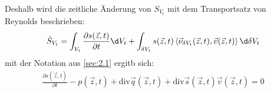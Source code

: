 Deshalb wird die zeitliche Änderung von $S_{V_t}$ mit dem Transportsatz von Reynolds beschrieben:
\begin{align*}
\dot{S}_{V_t} = \int_{V_t} \frac{\partial s(\vec{z},t)}{\partial t}\d V_t + \int_{\delta V_t}s(\vec{z},t) \left\langle \vec{\nu}_{\delta V_t}(\vec{z},t),\vec{v}(\vec{z},t) \right\rangle \d \delta V_t
\end{align*}
mit der Notation aus \ref{sec:2.1} ergitb sich:
\begin{align}
\frac{\partial s(\vec{z},t)}{\partial t}-p(\vec{z},t)+\mathrm{div}\vec{q}(\vec{z},t)+\mathrm{div}\vec{s}(\vec{z},t)\vec{v}(\vec{z},t) = 0
\end{align}